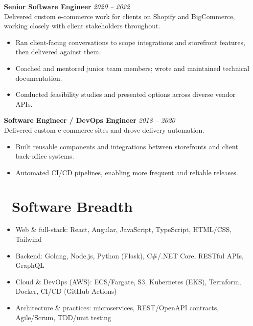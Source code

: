 \documentclass{resume}
\begin{document}
\vspace{1em}

\vspace{1em}
\textbf{Senior Software Engineer} \hfill \textit{2020 -- 2022} \\
Delivered custom e-commerce work for clients on Shopify and BigCommerce, working closely with client stakeholders throughout.
\begin{itemize}
  \item Ran client-facing conversations to scope integrations and storefront features, then delivered against them.
  \item Coached and mentored junior team members; wrote and maintained technical documentation.
  \item Conducted feasibility studies and presented options across diverse vendor APIs.
\end{itemize}

\vspace{1em}

\textbf{Software Engineer / DevOps Engineer} \hfill \textit{2018 -- 2020} \\
Delivered custom e-commerce sites and drove delivery automation.
\begin{itemize}
  \item Built reusable components and integrations between storefronts and client back-office systems.
  \item Automated CI/CD pipelines, enabling more frequent and reliable releases.
\end{itemize}

\section{\faLaptop\ Software Breadth}
\begin{itemize}[parsep=0.5ex]
  \item Web \& full-stack: React, Angular, JavaScript, TypeScript, HTML/CSS, Tailwind
  \item Backend: Golang, Node.js, Python (Flask), C\#/.NET Core, RESTful APIs, GraphQL
  \item Cloud \& DevOps (AWS): ECS/Fargate, S3, Kubernetes (EKS), Terraform, Docker, CI/CD (GitHub Actions)
  \item Architecture \& practices: microservices, REST/OpenAPI contracts, Agile/Scrum, TDD/unit testing
\end{itemize}
\end{document}
